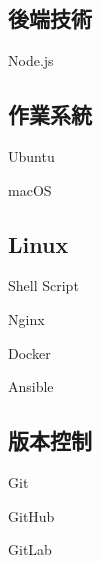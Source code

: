\documentclass[]{deedy-resume-openfont-ch}
\begin{document}
\begin{minipage}[t]{0.5\textwidth}
\begin{minipage}[t]{0.45\textwidth}
    \subsection{後端技術}
    \vspace{\topsep}
    \vspace{\topsep}
    \begin{tightemize}
        \item Node.js
    \end{tightemize}
\end{minipage}

\vspace{\topsep}
\begin{minipage}[t]{0.45\textwidth}
    \subsection{作業系統}
    \vspace{\topsep}
    \vspace{\topsep}
    \begin{tightemize}
        \item Ubuntu
        \item macOS
    \end{tightemize}
\end{minipage}
\hfill
\begin{minipage}[t]{0.45\textwidth}
    \subsection{Linux}
    \vspace{\topsep}
    \vspace{\topsep}
    \begin{tightemize}
        \item Shell Script
        \item Nginx
        \item Docker
        \item Ansible
    \end{tightemize}
\end{minipage}

\vspace{\topsep}
\begin{minipage}[t]{0.45\textwidth}
    \subsection{版本控制}
    \vspace{\topsep}
    \vspace{\topsep}
    \begin{tightemize}
        \item Git
        \item GitHub
        \item GitLab
    \end{tightemize}
\end{minipage}
\hfill
\begin{minipage}[t]{0.45\textwidth}

\end{minipage}
\end{minipage}
\end{document}
